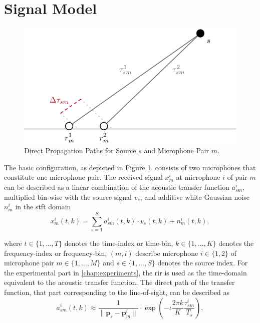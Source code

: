 \section{Signal Model}
\label{sec:signal}

\begin{figure}[!b]
\centering
    \includegraphics[scale=0.8]{data/figures/signal2}
    \caption{Direct Propagation Paths for Source $s$ and Microphone Pair $m$.}
    \label{fig:signal}
\end{figure}

The basic configuration, as depicted in Figure \ref{fig:signal}, consists of two microphones that constitute one microphone pair. The received signal $x^i_m$ at microphone $i$ of pair $m$ can be described as a linear combination of the acoustic transfer function $a^i_{sm}$, multiplied bin-wise with the source signal $v_s$, and additive white Gaussian noise $n^i_m$ in the \acrfull{stft} domain
\begin{equation}
	x_m^i(t,k)=\sum_{s=1}^{S}a_{sm}^i(t,k)\cdot v_s(t,k)+n_m^i(t,k),
	\label{eq:x}
\end{equation}

where $t\in\{1,\dots,T\}$ denotes the time-index or time-bin, $k\in\{1,\dots,K\}$ denotes the frequency-index or frequency-bin, $(m,i)$ describe microphone $i\in\{1,2\}$ of microphone pair $m\in\{1,\dots,M\}$ and $s\in\{1,\dots,S\}$ denotes the source index. For the experimental part in \autoref{chap:experiments}, the \gls{rir} is used as the time-domain equivalent to the acoustic transfer function. The direct path of the transfer function, that part corresponding to the line-of-sight, can be described as
\begin{equation}
	a_{sm}^i(t,k)\approx\frac{1}{\|\bm p_s-\bm p_m^i\|}\cdot\exp{\left(-\iota\frac{2\pi k}{K}\frac{\tau^i_{sm}}{T_s}\right)},
	\label{eq:acoustic_transfer_function}
\end{equation}

